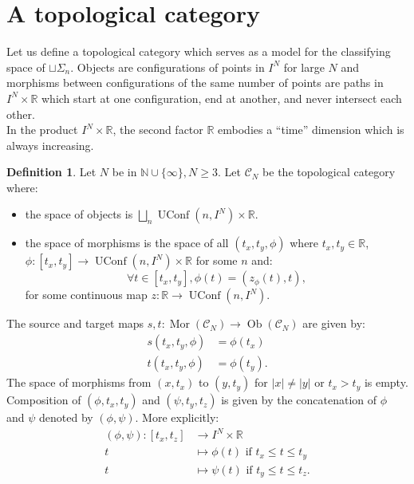 \documentclass[12pt]{amsart}
\theoremstyle{plain}
\theoremstyle{definition}
\newtheorem{defi}[teo]{Definition}
\theoremstyle{remark}
\newtheorem{rema}[teo]{Remark}
\DeclareMathOperator{\UConf}{UConf}
\DeclareMathOperator{\Mor}{Mor}
\DeclareMathOperator{\Ob}{Ob}
\newcommand{\C}{\mathcal{C}}
\begin{document}


\section{A topological category}

Let us define a topological category which serves as a model for the classifying space of $\displaystyle \sqcup \Sigma_n$. 
Objects are configurations of points in $I^N$ for large $N$ and morphisms between configurations of the same number of points are paths in $I^N\times \mathbb{R}$ which start at one configuration, end at another, and never intersect each other.\\
In the product $I^N\times\mathbb{R}$, the second factor $\mathbb{R}$ embodies a ``time'' dimension which is always increasing.

\begin{defi}
Let $N$ be in $\mathbb{N}\cup\{\infty\}, N\geq 3$. 
Let $\C_N$ be the topological category where:
\begin{itemize}
    \item the space of objects is $\displaystyle \bigsqcup_n \UConf (n, I^N)\times\mathbb{R}$.
    \item the space of morphisms is the space of all $(t_x,t_y,\phi)$
    where $t_x,t_y\in\mathbb{R}$, $\phi:[t_x,t_y] \rightarrow \UConf(n,I^N)\times\mathbb{R}$ for some $n$ and:
    $$\forall t\in [t_x,t_y], \phi(t) = (z_\phi(t), t),$$
    for some continuous map $z:\mathbb{R}\rightarrow \UConf(n,I^N)$.
    
\end{itemize}
The source and target maps $s,t: \Mor(\C_N)\rightarrow \Ob(\C_N)$ are given by:
\begin{align*}
s(t_x, t_y,\phi) &= \phi(t_x)\\
t(t_x, t_y, \phi) &= \phi(t_y).
\end{align*}
The space of morphisms from $(x,t_x)$ to $(y,t_y)$ for $\vert x\vert \neq \vert y\vert$ or $t_x>t_y$ is empty.
Composition of $(\phi, t_x, t_y)$ and $(\psi,t_y,t_z)$ is given by the concatenation of $\phi$ and $\psi$ denoted by $(\phi,\psi)$. More explicitly:
\begin{align*}
(\phi, \psi): [t_x,t_z] &\rightarrow I^N\times \mathbb{R}\\
t &\mapsto \phi(t) \text{ if } t_x\leq t\leq t_y \\
t&\mapsto \psi(t) \text{ if } t_y\leq t\leq t_z.
\end{align*}
\end{defi}
\end{document}
